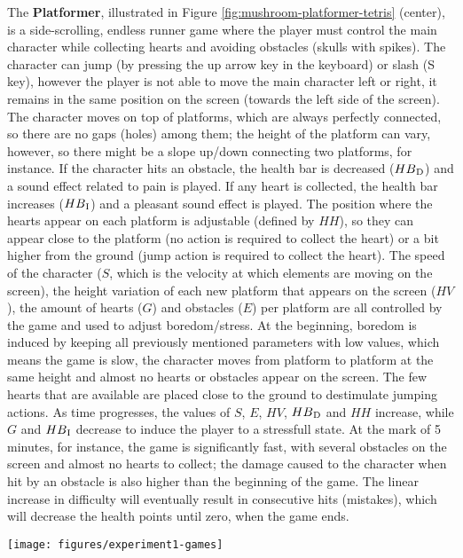 The \textbf{Platformer}, illustrated in Figure \ref{fig:mushroom-platformer-tetris} (center), is a side-scrolling, endless runner game where the player must control the main character while collecting hearts and avoiding obstacles (skulls with spikes). The character can jump (by pressing the up arrow key in the keyboard) or slash (S key), however the player is not able to move the main character left or right, it remains in the same position on the screen (towards the left side of the screen). The character moves on top of platforms, which are always perfectly connected, so there are no gaps (holes) among them; the height of the platform can vary, however, so there might be a slope up/down connecting two platforms, for instance. If the character hits an obstacle, the health bar is decreased ($HB\textsubscript{D}$) and a sound effect related to pain is played. If any heart is collected, the health bar increases ($HB\textsubscript{I}$) and a pleasant sound effect is played. The position where the hearts appear on each platform is adjustable (defined by $HH$), so they can appear close to the platform (no action is required to collect the heart) or a bit higher from the ground (jump action is required to collect the heart). The speed of the character ($S$, which is the velocity at which elements are moving on the screen), the height variation of each new platform that appears on the screen ($HV$), the amount of hearts ($G$) and obstacles ($E$) per platform are all controlled by the game and used to adjust boredom/stress. At the beginning, boredom is induced by keeping all previously mentioned parameters with low values, which means the game is slow, the character moves from platform to platform at the same height and almost no hearts or obstacles appear on the screen. The few hearts that are available are placed close to the ground to destimulate jumping actions. As time progresses, the values of $S$, $E$, $HV$, $HB\textsubscript{D}$ and $HH$ increase, while $G$ and $HB\textsubscript{I}$ decrease to induce the player to a stressfull state. At the mark of 5 minutes, for instance, the game is significantly fast, with several obstacles on the screen and almost no hearts to collect; the damage caused to the character when hit by an obstacle is also higher than the beginning of the game. The linear increase in difficulty will eventually result in consecutive hits (mistakes), which will decrease the health points until zero, when the game ends.

\begin{figure*}[!h]
\centering
\texttt{[image: figures/experiment1-games]}
\caption{Mushroom (left), Platformer (center) and Tetris (right). In Mushroom, player has to drag and drop the correct mushrooms into the character, discarding the wrong ones into the trash. In Platformer, the player has to jump over or slide under obstacles while collecting hearts. In our version of Tetris, there are no hints about the next piece to be added to the screen}
\label{fig:mushroom-platformer-tetris}
\end{figure*}

